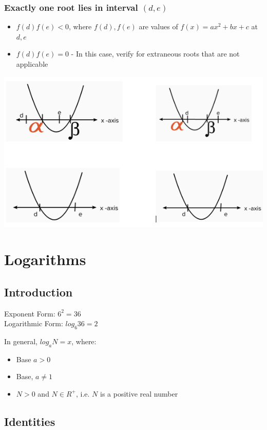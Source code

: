 \documentclass{book}
\begin{document}
	\subsection{Exactly one root lies in interval $(d,e)$}
	\begin{itemize}
		\item $f(d)f(e) <0$, where $f(d),f(e)$ are values of $f(x) = ax^2+bx+c$ at $d,e$
		\item $f(d)f(e)=0$ - In this case, verify for extraneous roots that are not applicable
	\end{itemize}
	
	\includegraphics[scale=0.6]{condition5}
	
	\chapter{Logarithms}
	\section{Introduction}
	Exponent Form: $6^2 = 36$ \\
	Logarithmic Form: $log_6{36} = 2$
	\begin{mdframed}[backgroundcolor=yellow]
		In general, $log_aN = x$, where:
		\begin{itemize}
			\item Base $a>0$
			\item Base, $a \neq 1$
			\item $N > 0$ and $N \in R^+$, i.e. $N$ is a positive real number
		\end{itemize}
	\end{mdframed}
	\section{Identities}
	
\end{document}

